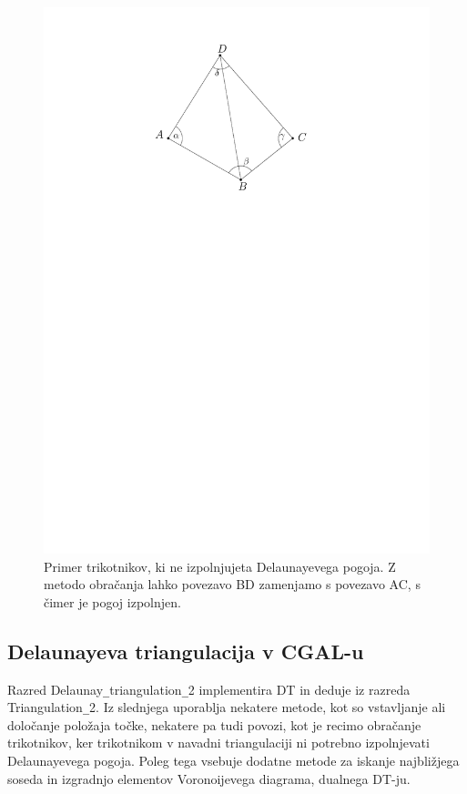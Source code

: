 \documentclass[a4paper, 12pt]{book}
\newcommand{\U}{\texttt{\_}}
\begin{document}
\begin{figure}[htp]
\centerline{\includegraphics[scale=0.8]{pics/dt-triangle.pdf}}
\caption{Primer trikotnikov, ki ne izpolnjujeta Delaunayevega pogoja. Z metodo obračanja lahko povezavo BD zamenjamo s povezavo AC, s čimer je pogoj izpolnjen.}
\label{dt-triangle}
\end{figure}

\subsection{Delaunayeva triangulacija v CGAL-u}
Razred Delaunay\U triangulation\U 2 implementira DT in deduje iz razreda Triangulation\U 2. Iz slednjega uporablja nekatere metode, kot so vstavljanje ali določanje položaja točke, nekatere pa tudi povozi, kot je recimo obračanje trikotnikov, ker trikotnikom v navadni triangulaciji ni potrebno izpolnjevati Delaunayevega pogoja. Poleg tega vsebuje dodatne metode za iskanje najbližjega soseda in izgradnjo elementov Voronoijevega diagrama, dualnega DT-ju.
\end{document}
